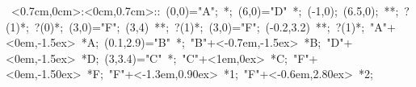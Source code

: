 
\hbox{
\xy    <0.7cm,0cm>:<0cm,0.7cm>::
       (0,0)="A"; *{\bullet}; (6,0)="D" *{\bullet};
       (-1,0); (6.5,0); **\dir{-};  ?(1)*\dir{>};  ?(0)*\dir{<}; 
       (3,0)="F"; (3,4) **\dir{-};  ?(1)*\dir{>}; 
       (3,0)="F"; (-0.2,3.2) **\dir{-};   ?(1)*\dir{>};
        "A"+<0em,-1.5ex> *{A};
	(0.1,2.9)="B" *{\bullet}; "B"+<-0.7em,-1.5ex> *{B};
	"D"+<0em,-1.5ex> *{D};
	(3,3.4)="C" *{\bullet}; "C"+<1em,0ex> *{C};
	"F"+<0em,-1.50ex> *{F};
	"F"+<-1.3em,0.90ex> *{1};  "F"+<-0.6em,2.80ex> *{2};
       \endxy}
	   
